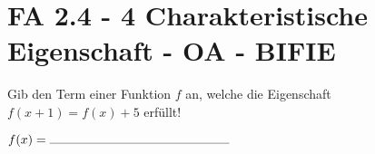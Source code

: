 \section{FA 2.4 - 4 Charakteristische Eigenschaft - OA - BIFIE}

\begin{beispiel}[FA 2.4]{1} %
Gib den Term einer Funktion $f$ an, welche die Eigenschaft $f(x+1)=f(x)+5$ erfüllt!
\leer

$f(x)=\rule{5cm}{0.3pt}$
\leer

\end{beispiel}